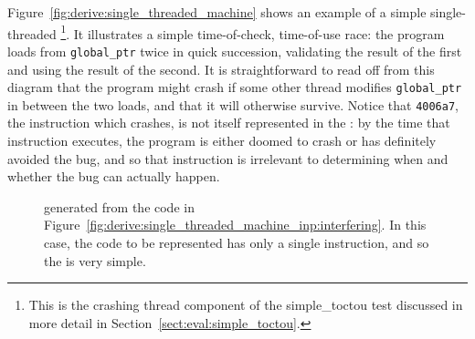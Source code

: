 Figure~\ref{fig:derive:single_threaded_machine} shows an example of a
simple single-threaded {\StateMachine}\footnote{This is the crashing
  thread component of the simple\_toctou test discussed in more detail
  in Section~\ref{sect:eval:simple_toctou}.}.  It illustrates a simple
time-of-check, time-of-use race: the program loads from
\verb|global_ptr| twice in quick succession, validating the result of
the first and using the result of the second.  It is straightforward
to read off from this diagram that the program might crash if some
other thread modifies \verb|global_ptr| in between the two loads, and
that it will otherwise survive.  Notice that \verb|4006a7|, the
instruction which crashes, is not itself represented in the
{\StateMachine}: by the time that instruction executes, the program is
either doomed to crash or has definitely avoided the bug, and so that
instruction is irrelevant to determining when and whether the bug can
actually happen.

\begin{figure}
  \begin{center}
  \end{center}
  \caption{{\STateMachine} generated from the code in
    Figure~\ref{fig:derive:single_threaded_machine_inp:interfering}.
    In this case, the code to be represented has only a single
    instruction, and so the {\StateMachine} is very
    simple. }
  \label{fig:derive:single_threaded_machine_write}
\end{figure}

